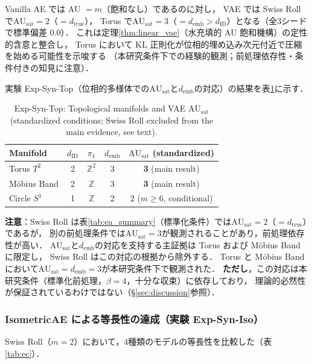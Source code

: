 \documentclass[11pt,a4paper]{jsarticle}
\newcommand{\dID}{d_{\mathrm{ID}}}
\newcommand{\dtrue}{d_{\mathrm{true}}}
\newcommand{\AUsat}{\mathrm{AU}_{\mathrm{sat}}}
\newcommand{\demb}{d_{\mathrm{emb}}}
\begin{document}
Vanilla AE では AU $= m$（飽和なし）であるのに対し，
VAE では Swiss Roll で$\AUsat = 2$（$= \dtrue$），
Torus で$\AUsat = 3$（$= \demb > \dID$）となる（全3シードで標準偏差 0.0）．
これは定理\ref{thm:linear_vae}（水充填的 AU 飽和機構）の定性的含意と整合し，
Torus において KL 正則化が位相的埋め込み次元付近で圧縮を始める可能性を示唆する
（本研究条件下での経験的観測；前処理依存性・条件付きの知見に注意）．

実験 Exp-Syn-Top（位相的多様体での$\AUsat$と$\demb$の対応）の結果を表\ref{tab:eb_summary}に示す．

\begin{table}[H]
\centering
\caption{Exp-Syn-Top: Topological manifolds and VAE $\AUsat$ (standardized conditions; Swiss Roll excluded from the main evidence, see text).}
\label{tab:eb_summary}
\small
\begin{tabular}{lcccc}
\toprule
Manifold & $\dID$ & $\pi_1$ & $\demb$ & $\AUsat$ (standardized) \\
\midrule
Torus $T^2$  & 2 & $\mathbb{Z}^2$ & 3 & \textbf{3} (main result) \\
Möbius Band  & 2 & $\mathbb{Z}$   & 3 & \textbf{3} (main result) \\
Circle $S^1$ & 1 & $\mathbb{Z}$   & 2 & 2 ($m \geq 6$, conditional) \\
\bottomrule
\end{tabular}
\end{table}

\textbf{注意}：Swiss Roll は表\ref{tab:ea_summary}（標準化条件）では$\AUsat=2$（$= \dtrue$）であるが，
別の前処理条件では$\AUsat=3$が観測されることがあり，前処理依存性が高い．
$\AUsat$と$\demb$の対応を支持する主証拠は Torus および Möbius Band に限定し，
Swiss Roll はこの対応の根拠から除外する．
Torus と Möbius Band において$\AUsat = \demb = 3$が本研究条件下で観測された．
\textbf{ただし}，この対応は本研究条件（標準化前処理，$\beta = 4$，十分な収束）に依存しており，
理論的必然性が保証されているわけではない（§\ref{sec:discussion}参照）．

\subsubsection{IsometricAE による等長性の達成（実験 Exp-Syn-Iso）}

Swiss Roll（$m = 2$）において，4種類のモデルの等長性を比較した（表\ref{tab:ec}）．
\end{document}
